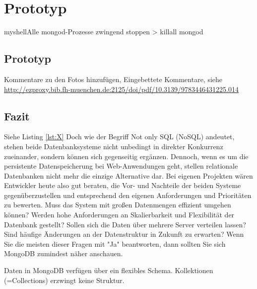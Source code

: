 \chapter{Prototyp}

\begin{listingsboxShell}[label={lst:X}]{myshell}{Alle mongod-Prozesse zwingend stoppen}
> killall mongod
\end{listingsboxShell}


\section{Prototyp}
Kommentare zu den Fotos hinzufügen, Eingebettete Kommentare, siehe \url{http://ezproxy.bib.fh-muenchen.de:2125/doi/pdf/10.3139/9783446431225.014}



\section{Fazit}
Siehe Listing \ref{lst:X} \newline 
Doch wie der Begriff Not only SQL (NoSQL) andeutet, stehen beide Datenbanksysteme nicht unbedingt in direkter Konkurrenz zueinander, sondern können sich gegenseitig ergänzen. Dennoch, wenn es um die persistente Datenspeicherung bei Web-Anwendungen geht, stellen relationale Datenbanken nicht mehr die einzige Alternative dar. Bei eigenen Projekten wären Entwickler heute also gut beraten, die Vor- und Nachteile der beiden Systeme gegenüberzustellen und entsprechend den eigenen Anforderungen und Prioritäten zu bewerten. Muss das System mit großen Datenmengen effizient umgehen können? Werden hohe Anforderungen an Skalierbarkeit und Flexibilität der Datenbank gestellt? Sollen sich die Daten über mehrere Server verteilen lassen? Sind häufige Änderungen an der Datenstruktur in Zukunft zu erwarten? Wenn Sie die meisten dieser Fragen mit "Ja" beantworten, dann sollten Sie sich MongoDB zumindest näher anschauen.\newline\newline

Daten in MongoDB verfügen über ein flexibles Schema. Kollektionen (=Collections) erzwingt keine Struktur.



